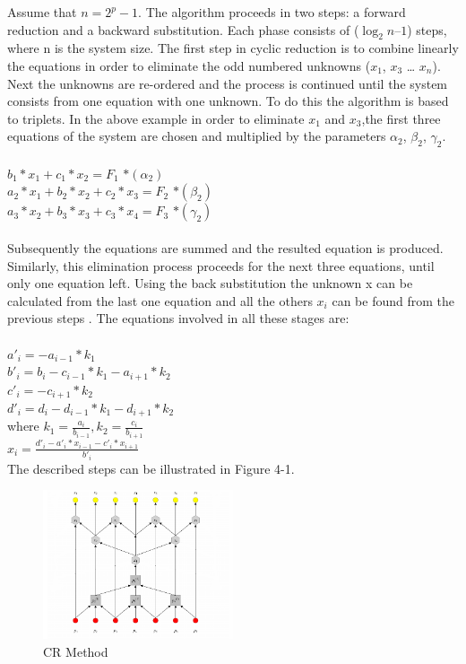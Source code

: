 Assume that $n= 2^p - 1$. 
The algorithm proceeds in two steps: a forward reduction and a backward substitution. Each phase consists of ($\log_2n – 1$) steps, where n is the system size. The first step in cyclic reduction is to combine linearly the equations in order to eliminate the odd numbered unknowns ($x_1$, $x_3$ … $x_n$). Next the unknowns are re-ordered and the process is continued until the system consists from one equation with one unknown. To do this the algorithm is based to triplets. In the above example in order to eliminate $x_1$ and $x_3$,the first three equations of the system are chosen and multiplied by the parameters $\alpha_2$, $\beta_2$, $\gamma_2$. \\
\\
$b_1*x_1+c_1*x_2= F_1$                        \hspace*{5cm} $*(\alpha_2)$	\\
$a_2*x_1+ b_2*x_2+c_2*x_3= F_2$               \hspace*{3,3cm} $* (\beta_2)$  \\
\hspace*{2cm}$a_3*x_2+ b_3*x_3+c_3*x_4= F_3$  \hspace*{1,3cm} $*(\gamma_2)$     \\ \\

Subsequently the equations are summed and the resulted equation is produced. Similarly, this elimination process proceeds for the next three equations, until only one equation left.
Using the back substitution the unknown x can be calculated from the last one equation and  all the others $x_i$ can be found  from the previous steps .
The equations involved in all these stages are:\\\\
$a'_i = -a_{i-1} *k_1$\\
$b'_i = b_{i} - c_{i-1}*k_1 - a_{i+1} *k_2$\\
$c'_i = -c_{i+1} *k_2$\\
$d'_i = d_{i} - d_{i-1}*k_1 - d_{i+1} *k_2$\\
where $k_1 = \frac{a_i}{b_{i-1}} , k_2 = \frac{c_i}{b_{i+1}} $\\
$x_i = \frac{d'_i - a'_i * x_{i-1} - c'_i * x_{i+1}}{b'_i}$\\
\newpage
The described steps can be illustrated in Figure 4-1.
\begin{figure}[H]
   \centering
       \includegraphics[width=0.5\textwidth]{figures/cr}
   \caption{CR Method}
   \label{fig:cr}
\end{figure}
